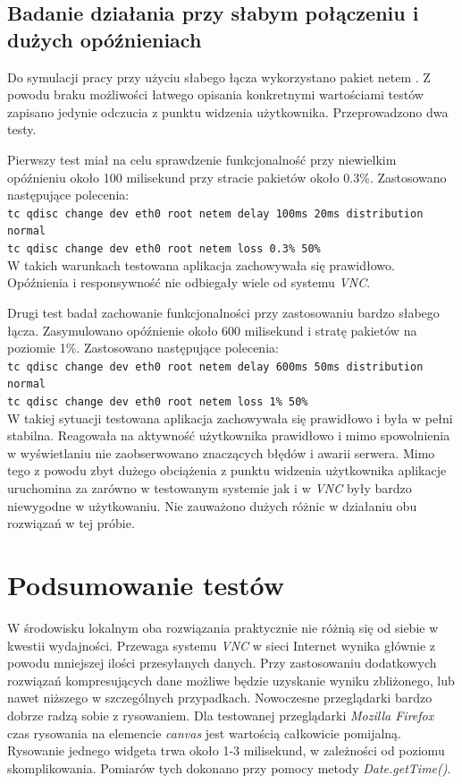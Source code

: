 \subsection{Badanie działania przy słabym połączeniu i dużych opóźnieniach}

Do symulacji pracy przy użyciu słabego łącza wykorzystano pakiet netem \cite{netem}. Z powodu braku możliwości łatwego opisania konkretnymi wartościami testów zapisano jedynie odczucia z punktu widzenia użytkownika. Przeprowadzono dwa testy.

Pierwszy test miał na celu sprawdzenie funkcjonalność przy niewielkim opóźnieniu około 100 milisekund przy stracie pakietów około 0.3\%. Zastosowano następujące polecenia:\\
\texttt{tc qdisc change dev eth0 root netem delay 100ms 20ms distribution normal} \\
\texttt{tc qdisc change dev eth0 root netem loss 0.3\% 50\%} \\ 
W takich warunkach testowana aplikacja zachowywała się prawidłowo. Opóźnienia i responsywność nie odbiegały wiele od systemu \emph{VNC}.

Drugi test badał zachowanie funkcjonalności przy zastosowaniu bardzo słabego łącza. Zasymulowano opóźnienie około 600 milisekund i stratę pakietów na poziomie 1\%. Zastosowano następujące polecenia: \\
\texttt{tc qdisc change dev eth0 root netem delay 600ms 50ms distribution normal} \\
\texttt{tc qdisc change dev eth0 root netem loss 1\% 50\%} \\ 
W takiej sytuacji testowana aplikacja zachowywała się prawidłowo i była w pełni stabilna. Reagowała na aktywność użytkownika prawidłowo i mimo spowolnienia w wyświetlaniu nie zaobserwowano znaczących błędów i awarii serwera.
Mimo tego z powodu zbyt dużego obciążenia z punktu widzenia użytkownika aplikacje uruchomina za zarówno w testowanym systemie jak i w \emph{VNC} były bardzo niewygodne w użytkowaniu. Nie zauważono dużych różnic w działaniu obu rozwiązań w tej próbie.

\section{Podsumowanie testów}
W środowisku lokalnym oba rozwiązania praktycznie nie różnią się od siebie w kwestii wydajności. Przewaga systemu \emph{VNC} w sieci Internet wynika głównie z powodu mniejszej ilości przesyłanych danych. Przy zastosowaniu dodatkowych rozwiązań kompresujących dane możliwe będzie uzyskanie wyniku zbliżonego, lub nawet niższego w szczególnych przypadkach.
Nowoczesne przeglądarki bardzo dobrze radzą sobie z rysowaniem. Dla testowanej przeglądarki \emph{Mozilla Firefox} czas rysowania na elemencie \emph{canvas} jest wartością całkowicie pomijalną. Rysowanie jednego widgeta trwa około 1-3 milisekund, w zależności od poziomu skomplikowania. Pomiarów tych dokonano przy pomocy metody \emph{Date.getTime()}.